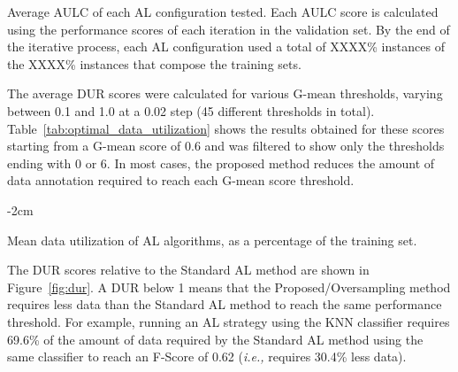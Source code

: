 \documentclass[parskip=full]{scrartcl}
\begin{document}
\begin{table}[htb]
    \centering
    \caption{\label{tab:aulc_scores}
        Average AULC of each AL configuration tested. Each AULC score is
        calculated using the performance scores of each iteration in the
        validation set. By the end of the iterative process, each AL
        configuration used a total of XXXX\% instances of the XXXX\% instances
        that compose the training sets.
    }
\end{table}

The average DUR scores were calculated for various G-mean thresholds, varying
between 0.1 and 1.0 at a 0.02 step (45 different thresholds in total).
Table~\ref{tab:optimal_data_utilization} shows the results obtained for these
scores starting from a G-mean score of 0.6 and was filtered to show only the
thresholds ending with 0 or 6. In most cases, the proposed method reduces the
amount of data annotation required to reach each G-mean score threshold.

\begin{table}[H]
    \centering
    \addtolength{\leftskip} {-2cm}
    \addtolength{\rightskip}{-2cm}
    \caption{\label{tab:optimal_data_utilization}
        Mean data utilization of AL algorithms, as a percentage of the
        training set.
    }
\end{table}

The DUR scores relative to the Standard AL method are shown in
Figure~\ref{fig:dur}. A DUR below 1 means that the Proposed/Oversampling
method requires less data than the Standard AL method to reach the same
performance threshold. For example, running an AL strategy using the KNN
classifier requires 69.6\% of the amount of data required by the Standard AL
method using the same classifier to reach an F-Score of 0.62 (\textit{i.e.,}
requires 30.4\% less data).
\end{document}
